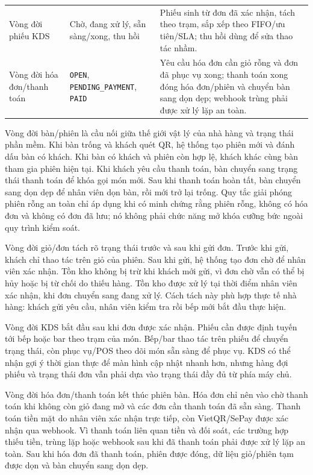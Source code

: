 \begin{longtable}{@{}>{\raggedright\arraybackslash}p{}>{\raggedright\arraybackslash}p{}>{\raggedright\arraybackslash}p{}@{}}
\addlinespace
Vòng đời phiếu KDS & Chờ, đang xử lý, sẵn sàng/xong, thu hồi & Phiếu sinh từ đơn đã xác nhận, tách theo trạm, sắp xếp theo FIFO/ưu tiên/SLA; thu hồi dùng để sửa thao tác nhầm. \\
\addlinespace
Vòng đời hóa đơn/thanh toán & \texttt{OPEN}, \texttt{PENDING\_PAYMENT}, \texttt{PAID} & Yêu cầu hóa đơn cần giỏ rỗng và đơn đã phục vụ xong; thanh toán xong đóng hóa đơn/phiên và chuyển bàn sang dọn dẹp; webhook trùng phải được xử lý lặp an toàn. \\
\bottomrule
\end{longtable}

Vòng đời bàn/phiên là cầu nối giữa thế giới vật lý của nhà hàng và trạng thái phần mềm. Khi bàn trống và khách quét QR, hệ thống tạo phiên mới và đánh dấu bàn có khách. Khi bàn có khách và phiên còn hợp lệ, khách khác cùng bàn tham gia phiên hiện tại. Khi khách yêu cầu thanh toán, bàn chuyển sang trạng thái thanh toán để khóa gọi món mới. Sau khi thanh toán hoàn tất, bàn chuyển sang dọn dẹp để nhân viên dọn bàn, rồi mới trở lại trống. Quy tắc giải phóng phiên rỗng an toàn chỉ áp dụng khi có minh chứng rằng phiên rỗng, không có hóa đơn và không có đơn đã lưu; nó không phải chức năng mở khóa cưỡng bức ngoài quy trình kiểm soát.

Vòng đời giỏ/đơn tách rõ trạng thái trước và sau khi gửi đơn. Trước khi gửi, khách chỉ thao tác trên giỏ của phiên. Sau khi gửi, hệ thống tạo đơn chờ để nhân viên xác nhận. Tồn kho không bị trừ khi khách mới gửi, vì đơn chờ vẫn có thể bị hủy hoặc bị từ chối do thiếu hàng. Tồn kho được xử lý tại thời điểm nhân viên xác nhận, khi đơn chuyển sang đang xử lý. Cách tách này phù hợp thực tế nhà hàng: khách gửi yêu cầu, nhân viên kiểm tra rồi bếp mới bắt đầu thực hiện.

Vòng đời KDS bắt đầu sau khi đơn được xác nhận. Phiếu cần được định tuyến tới bếp hoặc bar theo trạm của món. Bếp/bar thao tác trên phiếu để chuyển trạng thái, còn phục vụ/POS theo dõi món sẵn sàng để phục vụ. KDS có thể nhận gợi ý thời gian thực để màn hình cập nhật nhanh hơn, nhưng hàng đợi phiếu và trạng thái đơn vẫn phải dựa vào trạng thái đầy đủ từ phía máy chủ.

Vòng đời hóa đơn/thanh toán kết thúc phiên bàn. Hóa đơn chỉ nên vào chờ thanh toán khi không còn giỏ đang mở và các đơn cần thanh toán đã sẵn sàng. Thanh toán tiền mặt do nhân viên xác nhận trực tiếp, còn VietQR/SePay được xác nhận qua webhook. Vì thanh toán liên quan tiền và đối soát, các trường hợp thiếu tiền, trùng lặp hoặc webhook sau khi đã thanh toán phải được xử lý lặp an toàn. Sau khi hóa đơn đã thanh toán, phiên được đóng, dữ liệu giỏ/phiên tạm được dọn và bàn chuyển sang dọn dẹp.

